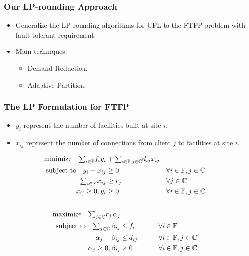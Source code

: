 \documentclass[handout, hyperref, xcolor=dvipsnames]{beamer}
\begin{document}

\begin{frame}
  \frametitle{Our LP-rounding Approach}
  \begin{itemize}
  \item Generalize the LP-rounding algorithms for UFL to the
    FTFP problem with fault-tolerant requirement.
  \item Main techniques:
    \begin{itemize}
    \item Demand Reduction.
    \item Adaptive Partition.
    \end{itemize}
  \end{itemize}

\end{frame}

\begin{frame}
  \frametitle{The LP Formulation for FTFP}
  \begin{itemize}
  \item $y_i$ represent the number of facilities built at site $i$.
  \item $x_{ij}$ represent the number of connections from
    client $j$ to facilities at site $i$.
  \end{itemize}
  \begin{alignat}{3}
    \textrm{minimize}\quad \textstyle{\sum_{i\in \mathbb{F}}}f_iy_i &+ \textstyle{\sum_{i\in \mathbb{F}, j\in \mathbb{C}}}d_{ij}x_{ij}&\label{eqn:fac_primal}
    \\ \notag
    \textrm{subject to}\quad y_i - x_{ij} &\geq 0  & &\forall i\in \mathbb{F}, j\in \mathbb{C} 
    \\ \notag
    \textstyle{\sum_{i\in \mathbb{F}} x_{ij}} &\geq r_j & &\forall j\in \mathbb{C}
    \\ \notag
    x_{ij} \geq 0, y_i &\geq 0 & &\forall i\in \mathbb{F}, j\in \mathbb{C} 
    \\ \notag
  \end{alignat}
  \begin{alignat}{3}
    \textrm{maximize}\quad \textstyle{\sum_{j\in \mathbb{C}}} r_j\, \alpha_j&\label{eqn:fac_dual}  
    \\ \notag
    \textrm{subject to} \quad \textstyle{
      \sum_{j\in \mathbb{C}}\beta_{ij}} &\leq f_i  &\quad\quad			&\forall i \in \mathbb{F}  
    \\ \notag
    \alpha_{j} - \beta_{ij} 	&\leq  d_{ij}       &                 & \forall i\in \mathbb{F}, j\in \mathbb{C} 
    \\ \notag
    \alpha_j \geq 0, \beta_{ij} &\geq 0           &            & \forall i\in \mathbb{F}, j\in \mathbb{C}
  \end{alignat}
\end{frame}
\end{document}
